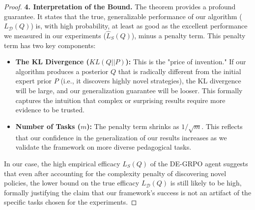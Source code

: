 \begin{proof}
\noindent\textbf{4. Interpretation of the Bound.}
The theorem provides a profound guarantee. It states that the true, generalizable performance of our algorithm ($L_{\mathcal{D}}(Q)$) is, with high probability, at least as good as the excellent performance we measured in our experiments ($\hat{L}_S(Q)$), minus a penalty term. This penalty term has two key components:
\begin{itemize}
    \item \textbf{The KL Divergence ($KL(Q || P)$):} This is the "price of invention." If our algorithm produces a posterior $Q$ that is radically different from the initial expert prior $P$ (i.e., it discovers highly novel strategies), the KL divergence will be large, and our generalization guarantee will be looser. This formally captures the intuition that complex or surprising results require more evidence to be trusted.
    \item \textbf{Number of Tasks ($m$):} The penalty term shrinks as $1/\sqrt{m}$. This reflects that our confidence in the generalization of our results increases as we validate the framework on more diverse pedagogical tasks.
\end{itemize}
In our case, the high empirical efficacy $\hat{L}_S(Q)$ of the DE-GRPO agent suggests that even after accounting for the complexity penalty of discovering novel policies, the lower bound on the true efficacy $L_{\mathcal{D}}(Q)$ is still likely to be high, formally justifying the claim that our framework's success is not an artifact of the specific tasks chosen for the experiments.
\end{proof}


